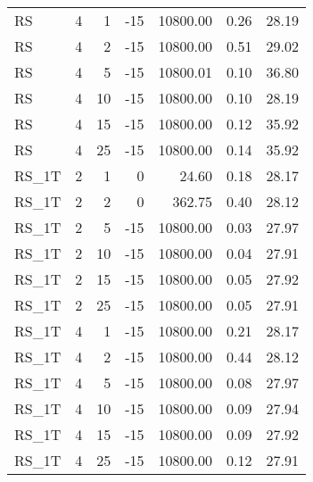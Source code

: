 \begin{center}
\begin{longtable}{lrrrrrr}
  RS     & 4 & 1 & -15 & 10800.00 & 0.26 & 28.19 \\ 
  RS     & 4 & 2 & -15 & 10800.00 & 0.51 & 29.02 \\ 
  RS     & 4 & 5 & -15 & 10800.01 & 0.10 & 36.80 \\ 
  RS     & 4 & 10 & -15 & 10800.00 & 0.10 & 28.19 \\ 
  RS     & 4 & 15 & -15 & 10800.00 & 0.12 & 35.92 \\ 
  RS     & 4 & 25 & -15 & 10800.00 & 0.14 & 35.92 \\ 
  RS\_1T     & 2 & 1 &   0 & 24.60 & 0.18 & 28.17 \\ 
  RS\_1T     & 2 & 2 &   0 & 362.75 & 0.40 & 28.12 \\ 
  RS\_1T     & 2 & 5 & -15 & 10800.00 & 0.03 & 27.97 \\ 
  RS\_1T     & 2 & 10 & -15 & 10800.00 & 0.04 & 27.91 \\ 
  RS\_1T     & 2 & 15 & -15 & 10800.00 & 0.05 & 27.92 \\ 
  RS\_1T     & 2 & 25 & -15 & 10800.00 & 0.05 & 27.91 \\ 
  RS\_1T     & 4 & 1 & -15 & 10800.00 & 0.21 & 28.17 \\ 
  RS\_1T     & 4 & 2 & -15 & 10800.00 & 0.44 & 28.12 \\ 
  RS\_1T     & 4 & 5 & -15 & 10800.00 & 0.08 & 27.97 \\ 
  RS\_1T     & 4 & 10 & -15 & 10800.00 & 0.09 & 27.94 \\ 
  RS\_1T     & 4 & 15 & -15 & 10800.00 & 0.09 & 27.92 \\ 
  RS\_1T     & 4 & 25 & -15 & 10800.00 & 0.12 & 27.91 \\ 
\end{longtable}
\end{center}
